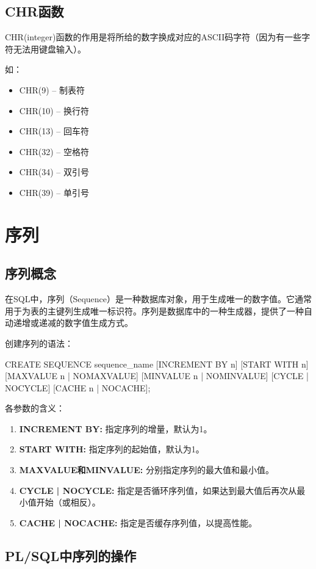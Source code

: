 \documentclass[11pt, a4paper, oneside, UTF8]{ctexbook}
\begin{document}
\section{CHR函数}
CHR(integer)函数的作用是将所给的数字换成对应的ASCII码字符（因为有一些字符无法用键盘输入）。

如：
\begin{itemize}
  \item CHR(9) -- 制表符
  \item CHR(10) -- 换行符
  \item CHR(13) -- 回车符
  \item CHR(32) -- 空格符
  \item CHR(34) -- 双引号
  \item CHR(39) -- 单引号
\end{itemize}

\chapter{序列}
\section{序列概念}
在SQL中，序列（Sequence）是一种数据库对象，用于生成唯一的数字值。它通常用于为表的主键列生成唯一标识符。序列是数据库中的一种生成器，提供了一种自动递增或递减的数字值生成方式。

创建序列的语法：
\begin{plsql}[caption=创建序列语法]
CREATE SEQUENCE sequence_name
  [INCREMENT BY n]
  [START WITH n]
  [MAXVALUE n | NOMAXVALUE]
  [MINVALUE n | NOMINVALUE]
  [CYCLE | NOCYCLE]
  [CACHE n | NOCACHE];
\end{plsql}

各参数的含义：
\begin{enumerate}
  \item \textbf{INCREMENT BY: }指定序列的增量，默认为1。
  \item \textbf{START WITH: }指定序列的起始值，默认为1。
  \item \textbf{MAXVALUE和MINVALUE: }分别指定序列的最大值和最小值。
  \item \textbf{CYCLE | NOCYCLE: }指定是否循环序列值，如果达到最大值后再次从最小值开始（或相反）。
  \item \textbf{CACHE | NOCACHE: }指定是否缓存序列值，以提高性能。
\end{enumerate}

\section{PL/SQL中序列的操作} 
\end{document}
